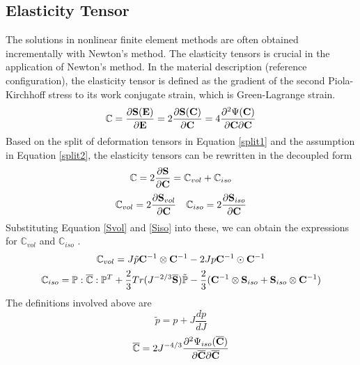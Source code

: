 \subsection{Elasticity Tensor}
The solutions in nonlinear finite element methods are often obtained incrementally with Newton's method. The elasticity tensors is crucial in the application of Newton's method.
In the material description (reference configuration), the elasticity tensor is defined as the gradient of the second Piola-Kirchhoff stress to its work conjugate strain, which is Green-Lagrange strain.
\begin{equation}
\mathbb{C} = \frac{\partial{\bold{S}(\bold{E})}}{\partial{\bold{E}}} =  2\frac{\partial{\bold{S}(\bold{C})}} {\partial{\bold{C}}} = 4 \frac{\partial^2{\Psi(\bold{C})}}{{\partial{\bold{C}}}{\partial{\bold{C}}}}
\end{equation}
Based on the split of deformation tensors in Equation \ref{split1} and the assumption in Equation \ref{split2}, the elasticity tensors can be rewritten in the decoupled form
\begin{equation} \label{C}
\mathbb{C} = 2\frac{\partial{\bold{S}}}{\partial{\bold{C}}} = \mathbb{C}_{vol} + \mathbb{C}_{iso} 
\end{equation}
\begin{equation}
\mathbb{C}_{vol} = 2\frac{\partial{\bold{S}_{vol}}}{\partial{\bold{C}}}
\quad
\mathbb{C}_{iso} = 2\frac{\partial{\bold{S}_{iso}}}{\partial{\bold{C}}}
\end{equation}
Substituting Equation \ref{Svol} and \ref{Siso}  into these, we can obtain the expressions for $\mathbb{C}_{vol}$ and $\mathbb{C}_{iso}$ .
\begin{equation} \label{Cvol}
\mathbb{C}_{vol} = J\tilde{p}\bold{C}^{-1}\otimes\bold{C}^{-1} - 2Jp\bold{C}^{-1}\odot\bold{C}^{-1}
\end{equation}
\begin{equation} \label{Ciso}
\mathbb{C}_{iso} = \mathbb{P} : \overline{\mathbb{C}} : \mathbb{P}^T + \frac{2}{3}Tr(J^{-2/3}\overline{\bold{S}})\tilde{\mathbb{P}} - \frac{2}{3}(\bold{C}^{-1}\otimes\bold{S}_{iso} + \bold{S}_{iso}\otimes \bold{C}^{-1})
\end{equation}
The definitions involved above are
\begin{equation}
\tilde{p} = p + J\frac{dp}{dJ}
\end{equation}
\begin{equation}
\overline{\mathbb{C}} = 2J^{-4/3}\frac{\partial^2\Psi_{iso}(\overline{\bold{C}})}{\partial{\overline{\bold{C}}}{\partial{\overline{\bold{C}}}}}
\end{equation}
